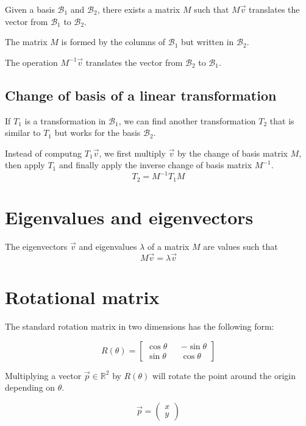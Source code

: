 \documentclass[a4paper]{article}
\begin{document}
Given a basis \(\mathcal{B}_1\) and \(\mathcal{B}_2\),
there exists a matrix \(M\) such that \(M\vec{v}\) translates
the vector from \(\mathcal{B}_1\) to \(\mathcal{B}_2\).

The matrix \(M\) is formed by the columns of \(\mathcal{B}_1\) but written in
\(\mathcal{B}_2\).

The operation \(M^{-1}\vec{v}\) translates
the vector from \(\mathcal{B}_2\) to \(\mathcal{B}_1\).

\subsection{Change of basis of a linear transformation}

If \(T_1\) is a transformation in \(\mathcal{B}_1\), we can find another
transformation \(T_2\) that is similar to \(T_1\) but works for the basis \(\mathcal{B}_2\).

Instead of computng \(T_1\vec{v}\), we first multiply \(\vec{v}\) by the
change of basis matrix \(M\), then apply \(T_1\) and finally apply the inverse change of basis matrix \(M^{-1}\).
\[
    T_2 = M^{-1}T_1M
\]

\section{Eigenvalues and eigenvectors}

The eigenvectors \(\vec{v}\) and eigenvalues \(\lambda\) of a matrix \(M\)
are values such that
\[
    M\vec{v} = \lambda \vec{v}
\]

\pagebreak

\section{Rotational matrix}

The standard rotation matrix in two dimensions has the following form:

\[
    R(\theta)=
    \begin{bmatrix} 
        \cos\theta && -\sin\theta \\
        \sin\theta && \cos\theta
    \end{bmatrix}
\]

Multiplying a vector \(\vec{p}\in \mathbb{R}^2\) by \(R(\theta)\) will rotate the point around the origin depending on \(\theta\).

\[
    \vec{p}=
    \begin{pmatrix} 
        x \\
        y
    \end{pmatrix}
\]
\end{document}
